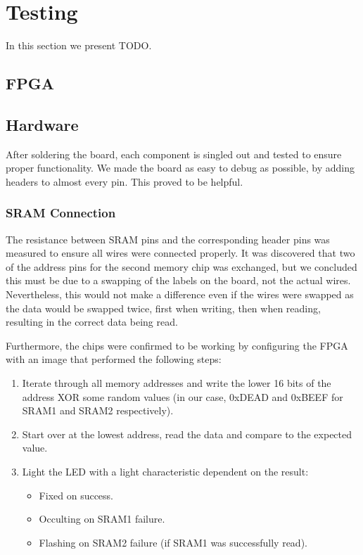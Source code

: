 \section{Testing}

In this section we present TODO.

\subsection{FPGA}


\subsection{Hardware}
After soldering the board, each component is singled out and tested to ensure proper functionality.
We made the board as easy to debug as possible, by adding headers to almost every pin.
This proved to be helpful.

\subsubsection{SRAM Connection}
The resistance between SRAM pins and the corresponding header pins was measured to ensure all wires were connected properly.
It was discovered that two of the address pins for the second memory chip was exchanged, but we concluded this must be due to a swapping of the labels on the board, not the actual wires.
Nevertheless, this would not make a difference even if the wires were swapped as the data would be swapped twice, first when writing, then when reading, resulting in the correct data being read.

Furthermore, the chips were confirmed to be working by configuring the FPGA with an image that performed the following steps:
\begin{enumerate}
    \item Iterate through all memory addresses and write the lower 16 bits of the address XOR some random values (in our case, 0xDEAD and 0xBEEF for SRAM1 and SRAM2 respectively).
    \item Start over at the lowest address, read the data and compare to the expected value.
    \item Light the LED with a light characteristic dependent on the result:
        \begin{itemize}
            \item Fixed on success.
            \item Occulting on SRAM1 failure.
            \item Flashing on SRAM2 failure (if SRAM1 was successfully read).
        \end{itemize}
\end{enumerate}

